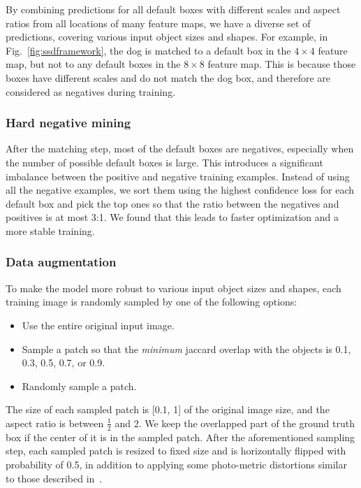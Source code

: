 \documentclass[runningheads]{llncs}
\begin{document}
By combining predictions for all default boxes with different scales and aspect ratios from all locations of many feature maps, we have a diverse set of predictions, covering various input object sizes and shapes. For example, in Fig.~\ref{fig:ssdframework}, the dog is matched to a default box in the $4\times 4$ feature map, but not to any default boxes in the $8\times 8$ feature map. This is because those boxes have different scales and do not match the dog box, and therefore are considered as negatives during training.
\vspace{-1em}
\subsubsection{Hard negative mining}
\label{sec:hardnegative}
After the matching step, most of the default boxes are negatives, especially when the number of possible default boxes is large. This introduces a significant imbalance between the positive and negative training examples. Instead of using all the negative examples, we sort them using the highest confidence loss for each default box and pick the top ones so that the ratio between the negatives and positives is at most 3:1. We found that this leads to faster optimization and a more stable training.
\vspace{-1em}
\subsubsection{Data augmentation}
\label{sec:dataaugmentation}
To make the model more robust to various input object sizes and shapes, each training image is randomly sampled by one of the following options:
\begin{itemize}
\setlength\itemsep{0em}
\item Use the entire original input image.
\item Sample a patch so that the \emph{minimum} jaccard overlap with the objects is 0.1, 0.3, 0.5, 0.7, or 0.9.
\item Randomly sample a patch.
\end{itemize}
The size of each sampled patch is [0.1, 1] of the original image size, and the aspect ratio is between $\frac{1}{2}$ and 2. We keep the overlapped part of the ground truth box if the center of it is in the sampled patch. After the aforementioned sampling step, each sampled patch is resized to fixed size and is horizontally flipped with probability of 0.5, in addition to applying some photo-metric distortions similar to those described in~\cite{howard2013some}.
\end{document}
